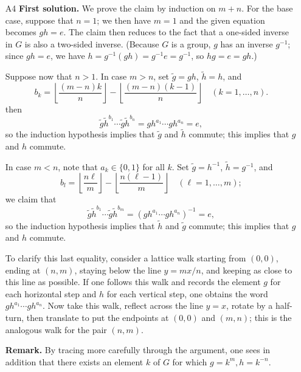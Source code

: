 \documentclass[amssymb,twocolumn,pra,10pt,aps]{revtex4-1}
\begin{document}
\begin{itemize}
\item[A4]
\noindent
\textbf{First solution.}
We prove the claim by induction on $m+n$.
For the base case, suppose that $n=1$; we then have $m=1$ and the given equation becomes $gh=e$. The claim then reduces to the fact that a one-sided inverse in $G$ is also a two-sided inverse. (Because $G$ is a group, $g$ has an inverse $g^{-1}$; since $gh = e$, we have $h = g^{-1}(gh) = g^{-1} e = g^{-1}$, so $hg = e = gh$.)

Suppose now that $n>1$. In case $m>n$, set $\tilde{g} = g h$, $\tilde{h} = h$, and
\[
b_k = \left\lfloor \frac{(m-n)k}{n} \right\rfloor - \left\lfloor \frac{(m-n)(k-1)}{n} \right\rfloor 
\quad (k=1,\dots,n).
\]
then
\[
\tilde{g} \tilde{h}^{b_1} \cdots \tilde{g} \tilde{h}^{b_n} = gh^{a_1} \cdots gh^{a_n} = e,
\]
so the induction hypothesis implies that $\tilde{g}$ and $\tilde{h}$ commute; this implies that $g$ and $h$ commute.

In case $m < n$, note that $a_k \in \{0,1\}$ for all $k$. Set $\tilde{g} = h^{-1}$, $\tilde{h} = g^{-1}$, and
\[
b_l = \left\lfloor \frac{n \ell}{m} \right\rfloor - \left\lfloor \frac{n(\ell-1)}{m} \right\rfloor 
\quad (\ell=1,\dots,m);
\]
we claim that 
\[
\tilde{g}\tilde{h}^{b_1}\cdots\tilde{g}\tilde{h}^{b_m} = (gh^{a_1}\cdots gh^{a_n})^{-1} = e,
\]
so the induction hypothesis implies that $\tilde{h}$ and $\tilde{g}$ commute; this implies that $g$ and $h$ commute.

To clarify this last equality, consider a lattice walk starting from $(0,0)$, ending at $(n,m)$, staying below the line
$y = mx/n$, and keeping as close to this line as possible. If one follows this walk and records the element $g$ for each horizontal step and $h$ for each vertical step, one obtains the word $gh^{a_1}\cdots gh^{a_n}$. 
Now take this walk, reflect across the line $y = x$, rotate by a half-turn, then translate to put the endpoints at $(0,0)$ and $(m,n)$; this is the analogous walk for the pair $(n,m)$.

\noindent
\textbf{Remark.}
By tracing more carefully through the argument, one sees in addition that there exists an element $k$ of $G$
for which $g = k^m, h = k^{-n}$.


\end{itemize}
\end{document}
